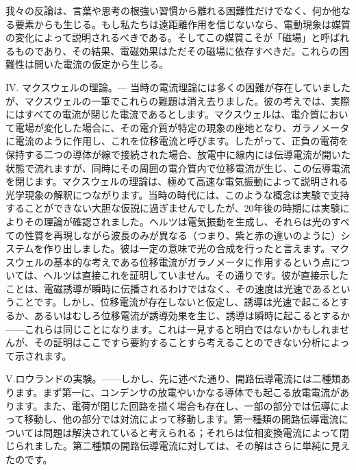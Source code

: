 \documentclass[a4paper,11pt,openany]{ltjsbook}
\begin{document}
我々の反論は、言葉や思考の根強い習慣から離れる困難性だけでなく、何か他なる要素からも生じる。もし私たちは遠距離作用を信じないなら、電動現象は媒質の変化によって説明されるべきである。そしてこの媒質こそが「磁場」と呼ばれるものであり、その結果、電磁効果はただその磁場に依存すべきだ。これらの困難性は開いた電流の仮定から生じる。

IV. マクスウェルの理論。— 当時の電流理論には多くの困難が存在していましたが、マクスウェルの一筆でこれらの難題は消え去りました。彼の考えでは、実際にはすべての電流が閉じた電流であるとします。マクスウェルは、電介質において電場が変化した場合に、その電介質が特定の現象の座地となり、ガラノメータに電流のように作用し、これを位移電流と呼びます。したがって、正負の電荷を保持する二つの導体が線で接続された場合、放電中に線内には伝導電流が開いた状態で流れますが、同時にその周囲の電介質内で位移電流が生じ、この伝導電流を閉じます。マクスウェルの理論は、極めて高速な電気振動によって説明される光学現象の解釈につながります。当時の時代には、このような概念は実験で支持することができない大胆な仮説に過ぎませんでしたが、20年後の時期には実験によりその理論が確認されました。ヘルツは電気振動を生成し、それらは光のすべての性質を再現しながら波長のみが異なる（つまり、紫と赤の違いのように）システムを作り出しました。彼は一定の意味で光の合成を行ったと言えます。マクスウェルの基本的な考えである位移電流がガラノメータに作用するという点については、ヘルツは直接これを証明していません。その通りです。彼が直接示したことは、電磁誘導が瞬時に伝播されるわけではなく、その速度は光速であるということです。しかし、位移電流が存在しないと仮定し、誘導は光速で起こるとするか、あるいはむしろ位移電流が誘導効果を生じ、誘導は瞬時に起こるとするか——これらは同じことになります。これは一見すると明白ではないかもしれませんが、その証明はここですら要約することすら考えることのできない分析によって示されます。

V.ロウランドの実験。——しかし、先に述べた通り、開路伝導電流には二種類あります。まず第一に、コンデンサの放電やいかなる導体でも起こる放電電流があります。また、電荷が閉じた回路を描く場合も存在し、一部の部分では伝導によって移動し、他の部分では対流によって移動します。第一種類の開路伝導電流については問題は解決されていると考えられる；それらは位相変換電流によって閉じられました。第二種類の開路伝導電流に対しては、その解はさらに単純に見えたのです。
\end{document}

